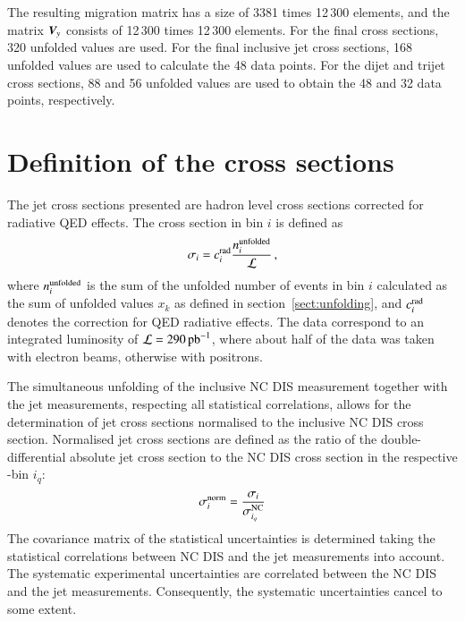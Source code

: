 \documentclass[12pt]{article}
\begin{document}
The resulting migration matrix has a size of 3381 times 12\,300 elements, and the 
matrix $\V_y$ consists of 12\,300 times 12\,300 elements.
For the final cross sections, 320 unfolded values are used.
For the final inclusive jet cross sections, 168 unfolded values are used to calculate the 48 data points.
For the dijet and trijet cross sections, 88 and 56 unfolded values are used to obtain the 48 and 32 data points, respectively.


\section{Definition of the cross sections}
\label{sec:def_of_CS}

The jet cross sections presented are hadron level cross sections corrected for 
radiative QED effects. The cross section in bin $i$ is defined as
\begin{equation}
 \sigma_i = c_i^{\rm rad}\frac{n_i^{\rm unfolded}}{\mathcal{L}}\, ,
 \label{eq:CSdefinition}
\end{equation}
where $n_i^{\rm unfolded}$ is the sum of the unfolded number of events in bin $i$ calculated as the
sum of unfolded values $x_k$ as defined in section~\ref{sect:unfolding},
and $c_i^{\rm rad}$ denotes the correction for QED radiative effects.
The data correspond to an integrated luminosity of $\mathcal{L} = 290\,\invpb$,
where about half of the data was taken with electron beams, otherwise with positrons.


The simultaneous unfolding of the inclusive NC DIS measurement together with the jet measurements, 
respecting all statistical correlations, allows for the determination 
of jet cross sections normalised to the inclusive NC DIS cross section. 
Normalised jet cross sections are defined as the ratio of the 
double-differential absolute jet cross section to the NC DIS cross 
section in the respective \Qsq-bin $i_{q}$:
\begin{equation}
 \sigma_i^{\rm norm} = \frac{\sigma_i}{\sigma_{i_{q}}^{\rm NC}}
 \label{eq:CSNormDefinition}
\end{equation}
The covariance matrix of the statistical uncertainties is determined taking the 
statistical correlations between NC DIS and the jet measurements into account.
The systematic experimental uncertainties are correlated 
between the NC DIS and the jet measurements.
Consequently, the systematic uncertainties cancel to some extent.
\end{document}
